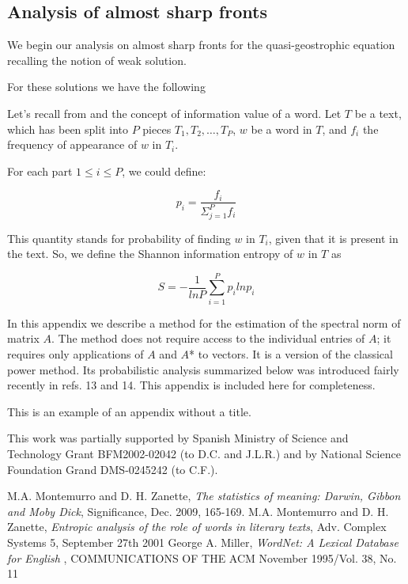 \documentclass{pnastwo}
\begin{document}
\begin{article}
\section{Analysis of almost sharp fronts}
We begin our analysis on almost sharp fronts for the
quasi-geostrophic equation recalling the notion of weak solution.

For these solutions we have the following



Let's recall from \cite{DARWIN} and \cite{ENTROPIC} the concept of information value of a word. 
Let $T$ be a text, which has been split into $P$ pieces $T_1, T_2, \dots, T_P$, $w$ be a word in $T$,
and $f_i$ the frequency of appearance of $w$ in $T_i$.

For each part $1 \leq i \leq P$, we could define:

\begin{equation}
  p_i = \frac{f_i}{\Sigma_{j=1}^{P}f_i}
\end{equation}

This quantity stands for probability of finding $w$ in $T_i$, given that it is present in the text. So, 
we define the Shannon information entropy of $w$ in $T$ as

\begin{equation}
  S = -\frac{1}{ln P}\sum_{i=1}^{P}p_i ln p_i
\end{equation}


In this appendix we describe a method for the estimation of the spectral norm
of matrix $A$. The method does not require access to the individual
entries of $A$; it requires only applications of $A$ and $A$* to vectors.
It is a version of the classical power method. Its probabilistic
analysis summarized below was introduced fairly recently in refs. 13
and 14. This appendix is included here for completeness.


\appendix
This is an example of an appendix without a title.

\begin{acknowledgments}
This work was partially supported by 
Spanish Ministry of Science and Technology Grant BFM2002-02042 (to D.C. and
J.L.R.) and by National Science Foundation Grand DMS-0245242 (to C.F.).
\end{acknowledgments}



\begin{thebibliography}{10}
M.A. Montemurro and D. H. Zanette, {\em The statistics of meaning: Darwin, Gibbon and Moby Dick}, Significance, Dec. 2009, 165-169.
M.A. Montemurro and D. H. Zanette, {\em Entropic analysis of the role of words in literary texts}, Adv. Complex Systems 5, September 27th 2001
George A. Miller, {\em WordNet: A Lexical Database for English }, COMMUNICATIONS OF THE ACM November 1995/Vol. 38, No. 11

\end{thebibliography}
\end{article}
\end{document}
